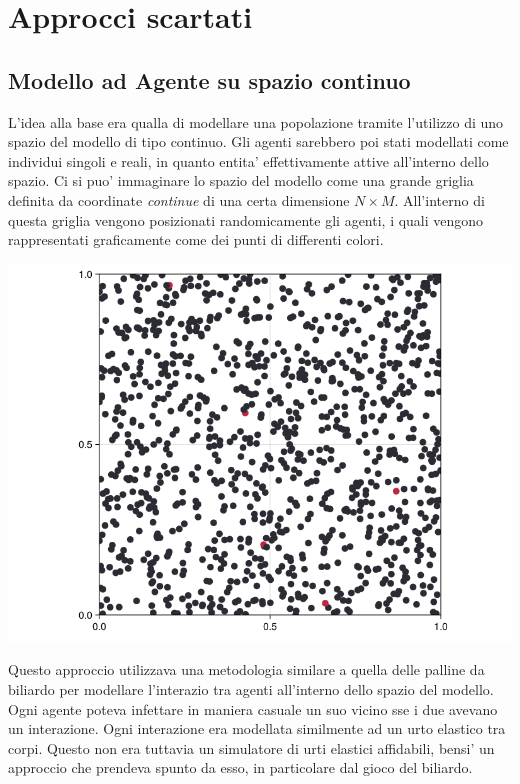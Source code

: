 \section{Approcci scartati}

\subsection{Modello ad Agente su spazio continuo}
L'idea alla base era qualla di modellare una popolazione tramite l'utilizzo di 
uno spazio del modello di tipo continuo. Gli agenti sarebbero poi stati modellati come 
individui singoli e reali, in quanto entita' effettivamente attive all'interno 
dello spazio. Ci si puo' immaginare lo spazio del modello come una grande griglia 
definita da coordinate \emph{continue} di una certa dimensione \emph{$N \times M$}. All'interno 
di questa griglia vengono posizionati randomicamente gli agenti, i quali vengono 
rappresentati graficamente come dei punti di differenti colori.

\begin{minipage}{\linewidth}
    \centering
    \includegraphics[width=\textwidth]{img/ball-covid.png}
    \label{fig:ball_covid}
\end{minipage}

Questo approccio utilizzava una metodologia similare a quella delle palline da biliardo 
per modellare l'interazio tra agenti all'interno dello spazio del modello. Ogni agente poteva
infettare in maniera casuale un suo vicino sse i due avevano un interazione. Ogni interazione
era modellata similmente ad un urto elastico \cite{wiki:Urto_elastico} tra corpi. 
Questo non era tuttavia un simulatore di urti elastici affidabili, bensi' un approccio che prendeva
spunto da esso, in particolare dal gioco del biliardo. 


